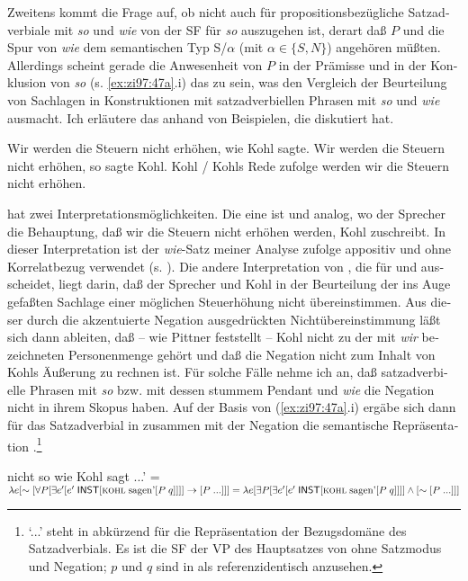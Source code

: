 \documentclass[output=paper, colorlinks, citecolor=brown, booklanguage=german]{langscibook}
\begin{document}
\begin{otherlanguage}{german}
Zweitens kommt die Frage auf, ob nicht auch für propositionsbezügliche Satzadverbiale mit \textit{so} und \textit{wie} von der SF  für \textit{so} auszugehen ist, derart daß $P$ und die Spur von \textit{wie} dem semantischen Typ S/$\alpha$ (mit $\alpha \in \{S,N\}$) angehören müßten. Allerdings scheint gerade die Anwesenheit von $P$ in der Prämisse und in der Konklusion von \textit{so} (s. \ref{ex:zi97:47a}.i) das zu sein, was den Vergleich der Beurteilung von Sachlagen in Konstruktionen mit satzadverbiellen Phrasen mit \textit{so} und \textit{wie} ausmacht. Ich erläutere das anhand von Beispielen, die \citet{pittner93, pittner95} diskutiert hat.

\ea \label{ex:zi97:58}
    \ea \label{ex:zi97:58a} Wir werden die Steuern nicht erhöhen, wie Kohl sagte.
    \ex \label{ex:zi97:58b} Wir werden die Steuern nicht erhöhen, so sagte Kohl.
    \ex \label{ex:zi97:58c} Kohl / Kohls Rede zufolge werden wir die Steuern nicht erhöhen.
    \z
\z

\noindent {} hat zwei Interpretationsmöglichkeiten. Die eine ist  und  analog, wo der Sprecher die Behauptung, daß wir die Steuern nicht erhöhen werden, Kohl zuschreibt. In dieser Interpretation ist der \textit{wie}-Satz meiner Analyse zufolge appositiv und ohne Korrelatbezug verwendet (s. ). Die andere Interpretation von , die für  und  ausscheidet, liegt darin, daß der Sprecher und Kohl in der Beurteilung der ins Auge gefaßten Sachlage einer möglichen Steuerhöhung nicht übereinstimmen. Aus dieser durch die akzentuierte Negation ausgedrückten Nichtübereinstimmung läßt sich dann ableiten, daß -- wie Pittner feststellt -- Kohl nicht zu der mit \textit{wir} bezeichneten Personenmenge gehört und daß die Negation nicht zum Inhalt von Kohls Äußerung zu rechnen ist. Für solche Fälle nehme ich an, daß satzadverbielle Phrasen mit \textit{so} bzw. mit dessen stummem Pendant und \textit{wie} die Negation nicht in ihrem Skopus haben. Auf der Basis von (\ref{ex:zi97:47a}.i) ergäbe sich dann für das Satzadverbial in  zusammen mit der Negation die semantische Repräsentation .\footnote{`...' steht in  abkürzend für die Repräsentation der Bezugsdomäne des Satzadverbials. Es ist die SF der VP des Hauptsatzes von  ohne Satzmodus und Negation; $p$ und $q$ sind in  als referenzidentisch anzusehen.}

\ea \label{ex:zi97:59} nicht so wie Kohl sagt ...' = \\
$\lambda e [\sim [\forall P [\exists e' [e' \; \cnst{inst} [\textsc{kohl} \; \text{sagen'} [P \; q]]]] \rightarrow %
[P \; ...]]] = \newline
\lambda e [\exists P [\exists e' [e' \; \cnst{inst} [\textsc{kohl} \; \text{sagen'} [P \; q]]]] \wedge %
[\sim [P \; ...]]]$
\z


\end{otherlanguage}
\end{document}
